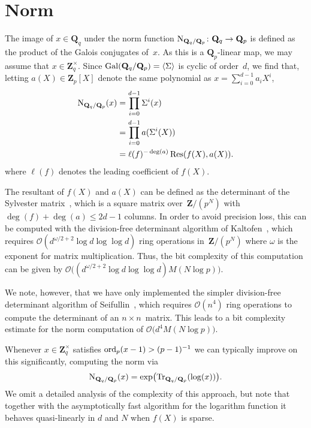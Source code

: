 \section{Norm}

The image of $x \in \mathbf{Q}_q$ under the norm function 
$\operatorname{N}_{\mathbf{Q}_q/\mathbf{Q}_p} \colon \mathbf{Q}_q \rightarrow \mathbf{Q}_p$ 
is defined as the product of the Galois conjugates of~$x$.  As this 
is a $\mathbf{Q}_p$-linear map, we may assume that 
$x \in \mathbf{Z}_q^{\times}$.  Since 
$\operatorname{Gal}(\mathbf{Q}_q/\mathbf{Q}_p) = \langle \Sigma \rangle$ is cyclic 
of order~$d$, we find that, letting $a(X) \in \mathbf{Z}_p[X]$ denote 
the same polynomial as $x = \sum_{i=0}^{d-1} a_i X^i$, 
\begin{equation}
\begin{split}
\operatorname{N}_{\mathbf{Q}_q/\mathbf{Q}_p} (x) & = \prod_{i=0}^{d-1} \Sigma^i (x) \\
                                      & = \prod_{i=0}^{d-1} a(\Sigma^i(X)) \\
                                      & = \ell(f)^{- \deg(a)} \operatorname{Res}(f(X), a(X)).
\end{split}
\end{equation}
where $\ell(f)$ denotes the leading coefficient of $f(X)$.  

The resultant of $f(X)$ and $a(X)$ can be defined as the 
determinant of the Sylvester matrix~\citep[Lemma~3.3.4]{Coh93}, which is a 
square matrix over~$\mathbf{Z} / (p^N)$ with $\deg(f) + \deg(a) \leq 2d - 1$ 
columns. In order to avoid precision loss, this can be computed with the 
division-free determinant algorithm of Kaltofen~\citep{Kaltofen1992}, which 
requires $\mathcal{O}(d^{\omega/2 + 2} \log d \log \log d)$ ring operations 
in~$\mathbf{Z} / (p^N)$ where $\omega$ is the exponent for matrix multiplication.
Thus, the bit complexity of this computation can be given by 
$\mathcal{O}\bigl((d^{\omega/2 + 2} \log d \log \log d) M(N \log p)\bigr)$.

We note, however, that we have only implemented the simpler division-free 
determinant algorithm of Seifullin~\citep[Algorithm~4.2]{Seifullin2002}, 
which requires $\mathcal{O}(n^4)$ ring operations to compute the 
determinant of an $n \times n$~matrix.  This leads to a bit complexity 
estimate for the norm computation of $\mathcal{O}\bigl(d^4 M(N \log p)\bigr)$.

Whenever $x \in \mathbf{Z}_q^{\times}$ satisfies $\operatorname{ord}_p(x-1) > (p-1)^{-1}$ 
we can typically improve on this significantly, computing the norm via
\begin{equation}
\operatorname{N}_{\mathbf{Q}_q / \mathbf{Q}_p} (x) 
= \exp \bigl(\operatorname{Tr}_{\mathbf{Q}_q / \mathbf{Q}_p} (\log (x))\bigr).
\end{equation}
We omit a detailed analysis of the complexity of this approach, but note 
that together with the asymptotically fast algorithm for the logarithm 
function it behaves quasi-linearly in $d$ and $N$ when $f(X)$ is sparse.

